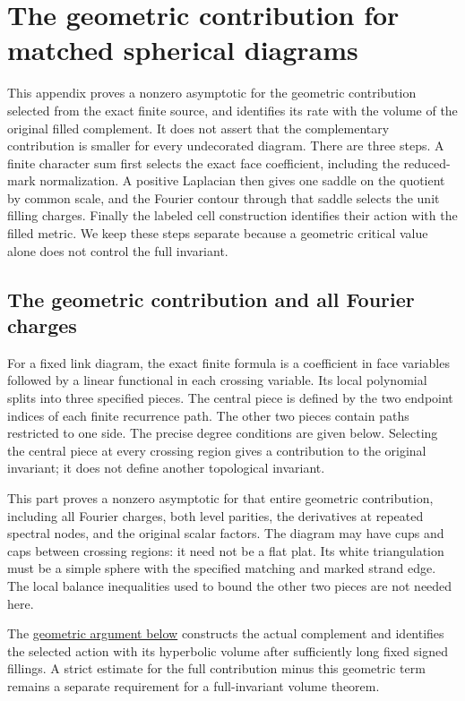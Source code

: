 \chapter{The geometric contribution for matched spherical diagrams}
\label{app:morse-geometric-contribution}

This appendix proves a nonzero asymptotic for the geometric contribution
selected from the exact finite source, and identifies its rate with the
volume of the original filled complement. It does not assert that the
complementary contribution is smaller for every undecorated diagram.
There are three steps. A finite character sum first selects the exact
face coefficient, including the reduced-mark normalization. A positive
Laplacian then gives one saddle on the quotient by common scale, and
the Fourier contour through that saddle selects the unit filling
charges. Finally the labeled cell construction identifies their action
with the filled metric. We keep these steps separate because a
geometric critical value alone does not control the full invariant.

\section{The geometric contribution and all Fourier
charges}\label{mca:unit}

For a fixed link diagram, the exact finite formula is a coefficient in
face variables followed by a linear functional in each crossing
variable. Its local polynomial splits into three specified pieces. The
central piece is defined by the two endpoint indices of each finite
recurrence path. The other two pieces contain paths restricted to one side.
The precise degree conditions are given below. Selecting the central piece at every
crossing region gives a contribution to the original invariant; it does
not define another topological invariant.

This part proves a nonzero asymptotic for that entire geometric
contribution, including all Fourier charges, both level parities, the
derivatives at repeated spectral nodes, and the original scalar factors.
The diagram may have cups and caps between crossing regions: it need not
be a flat plat. Its white triangulation must be a simple sphere with the
specified matching and marked strand edge. The local balance
inequalities used to bound the other two pieces are not needed here.

The
\hyperref[mcg:unit]{geometric
argument below} constructs the actual complement and identifies the selected
action with its hyperbolic volume after sufficiently long fixed signed
fillings. A strict estimate for the full contribution minus this
geometric term remains a separate requirement for a full-invariant
volume theorem.

